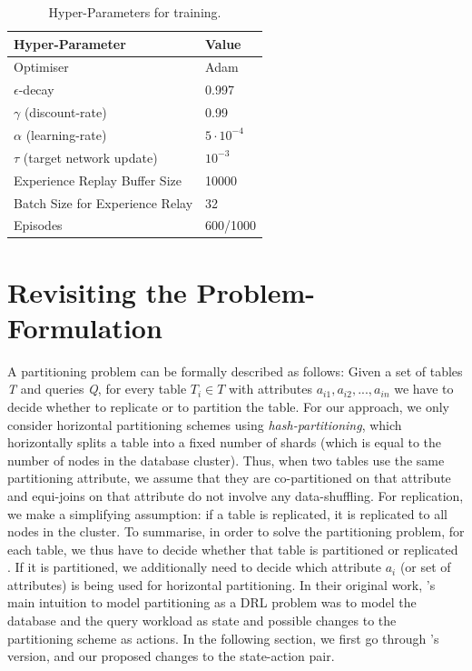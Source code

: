 \begin{table}[ht]
\centering
    \begin{tabular}{|l|l|}
    \hline
    \rowcolor[HTML]{DAE8FC} 
    \textbf{Hyper-Parameter} & \textbf{Value} \\ \hline
    Optimiser                & Adam           \\ \hline
    $\epsilon$-decay         & 0.997          \\ \hline
    $\gamma$ (discount-rate) & 0.99           \\ \hline
    $\alpha$ (learning-rate) & $5 \cdot 10^{-4}$         \\ \hline
    $\tau$ (target network update) & $10^{-3}$ \\ \hline
    Experience Replay Buffer Size & 10000 \\ \hline
    Batch Size for Experience Relay & 32 \\ \hline
    Episodes & 600/1000 \\ \hline
    \end{tabular}
    \caption{Hyper-Parameters for training.}
    \label{tab:hyp-param}
\end{table}

\section{Revisiting the Problem-Formulation}
A partitioning problem can be formally described as follows: Given a set of tables \textit{T} and queries \textit{Q}, for every table $T_i \in T$ with attributes $a_{i1},a_{i2},...,a_{in}$ we have to decide whether to replicate or to partition the table. For our approach, we only consider horizontal partitioning schemes using \textit{hash-partitioning}, which horizontally splits a table into a fixed number of shards (which is equal to the number of nodes in the database cluster). Thus, when two tables use the same partitioning attribute, we assume that they are co-partitioned on that attribute and equi-joins on that attribute do not involve any data-shuffling. For replication, we make a simplifying assumption: if a table is replicated, it is replicated to all nodes in the cluster. 
To summarise, in order to solve the partitioning problem, for each table, we thus have to decide whether that table is partitioned or replicated \cite{Hilprecht:2019:TLP:3329859.3329876}. If it is partitioned, we additionally need to decide which attribute $a_i$ (or set of attributes) is being used for horizontal partitioning.
In their original work, \citeauthor{Hilprecht:2019:TLP:3329859.3329876}'s main intuition to model partitioning as a DRL problem was to model the database and the query workload as state and possible changes to the partitioning scheme as actions. In the following section, we first go through \citeauthor{Hilprecht:2019:TLP:3329859.3329876}'s version, and our proposed changes to the state-action pair.

